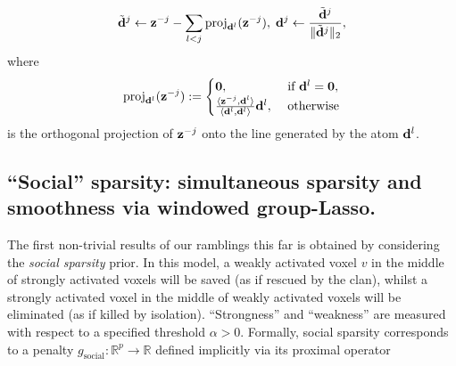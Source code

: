   \begin{eqnarray}
    \tilde{\mathbf{d}}^j \leftarrow \mathbf{z}^{-j} -\sum_{l < j}\operatorname{proj}_{\mathbf{d}^l}(\mathbf{z}^{-j}),\;\mathbf{d}^j \leftarrow \frac{\tilde{\mathbf{d}}^j}{\|\tilde{\mathbf{d}}^j\|_2},
  \end{eqnarray}
  where
  $$
  \operatorname{proj}_{\mathbf{d}^l}(\mathbf{z}^{-j}) := \begin{cases}\textbf{0},&\mbox{ if }\mathbf{d}^l = \textbf{0},\\
    \frac{\langle \mathbf{z}^{-j},\mathbf{d}^l\rangle}{\langle \mathbf{d}^l,\mathbf{d}^l\rangle}\mathbf{d}^l,&\mbox{ otherwise}
  \end{cases}
  $$
  is the orthogonal projection of $\mathbf{z}^{-j}$ onto the line generated by the atom  $\mathbf{d}^l$.
  

 \subsection{``Social'' sparsity:  simultaneous sparsity and smoothness via windowed group-Lasso.}
  The first non-trivial results of our ramblings this far is obtained by considering the \textit{social sparsity}  \citep{kowalski2013social,kowalski2009structured} prior. In this model, a weakly activated voxel $v$ in the middle of strongly activated voxels will be saved (as if rescued by the clan), whilst a strongly activated voxel in the middle of weakly activated voxels will be eliminated (as if killed by isolation). ``Strongness'' and ``weakness'' are measured with respect to a specified threshold $\alpha > 0$.
Formally, social sparsity corresponds to a penalty  $g_{\text{social}} : \mathbb R^p \rightarrow \mathbb R$ defined implicitly via its proximal operator

